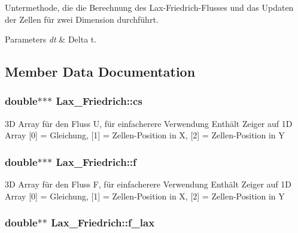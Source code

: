 Untermethode, die die Berechnung des Lax-\/\-Friedrich-\/\-Flusses und das Updaten der Zellen für zwei Dimension durchführt. 
\begin{DoxyParams}{Parameters}
{\em dt} & Delta t. \\
\hline
\end{DoxyParams}


\subsection{Member Data Documentation}
\hypertarget{classLax__Friedrich_ae3409552d0a7e6e2168d7292183f2509}{
\subsubsection[{cs}]{\setlength{\rightskip}{0pt plus 5cm}double$\ast$$\ast$$\ast$ Lax\-\_\-\-Friedrich\-::cs\hspace{0.3cm}{\ttfamily [protected]}}}\label{classLax__Friedrich_ae3409552d0a7e6e2168d7292183f2509}
3\-D Array für den Fluss U, für einfacherere Verwendung Enthält Zeiger auf 1\-D Array \mbox{[}0\mbox{]} = Gleichung, \mbox{[}1\mbox{]} = Zellen-\/\-Position in X, \mbox{[}2\mbox{]} = Zellen-\/\-Position in Y \hypertarget{classLax__Friedrich_a2e593b52e256ab0be6cf06eed59566e7}{
\subsubsection[{f}]{\setlength{\rightskip}{0pt plus 5cm}double$\ast$$\ast$$\ast$ Lax\-\_\-\-Friedrich\-::f\hspace{0.3cm}{\ttfamily [protected]}}}\label{classLax__Friedrich_a2e593b52e256ab0be6cf06eed59566e7}
3\-D Array für den Fluss F, für einfacherere Verwendung Enthält Zeiger auf 1\-D Array \mbox{[}0\mbox{]} = Gleichung, \mbox{[}1\mbox{]} = Zellen-\/\-Position in X, \mbox{[}2\mbox{]} = Zellen-\/\-Position in Y \hypertarget{classLax__Friedrich_a007ddad79c40ef536d303cbe136dfdb6}{
\subsubsection[{f\-\_\-lax}]{\setlength{\rightskip}{0pt plus 5cm}double$\ast$$\ast$ Lax\-\_\-\-Friedrich\-::f\-\_\-lax\hspace{0.3cm}{\ttfamily [protected]}}}\label{classLax__Friedrich_a007ddad79c40ef536d303cbe136dfdb6}

